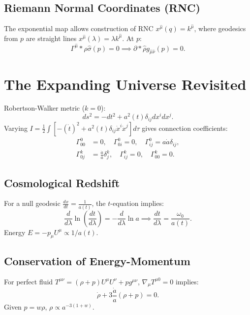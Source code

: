 \documentclass[11pt, a4paper]{report}
\begin{document}
\subsection*{Riemann Normal Coordinates (RNC)}
The exponential map allows construction of RNC $x^{\hat{\mu}}(q) = k^{\hat{\mu}}$, where geodesics from $p$ are straight lines $x^{\hat{\mu}}(\lambda) = \lambda k^{\hat{\mu}}$. At $p$:
\begin{equation}
\Gamma^{\hat{\mu}}*{\hat{\rho}\hat{\sigma}}(p) = 0 \implies \partial*{\hat{\rho}} g_{\hat{\mu}\hat{\nu}}(p) = 0.
\end{equation}

\section{The Expanding Universe Revisited}
Robertson-Walker metric ($k=0$):
\begin{equation}
ds^2 = -dt^2 + a^2(t) \delta_{ij} dx^i dx^j.
\end{equation}
Varying $I = \frac{1}{2} \int \left[ -(\dot{t})^2 + a^2(t) \delta_{ij} \dot{x}^i \dot{x}^j \right] d\tau$ gives connection coefficients:
\begin{align}
\Gamma^0_{00} &= 0, \quad \Gamma^0_{0i} = 0, \quad \Gamma^0_{ij} = a\dot{a} \delta_{ij}, \\
\Gamma^k_{0j} &= \frac{\dot{a}}{a} \delta^k_j, \quad \Gamma^k_{ij} = 0, \quad \Gamma^k_{00} = 0.
\end{align}

\subsection*{Cosmological Redshift}
For a null geodesic $\frac{dx}{dt} = \frac{1}{a(t)}$, the $t$-equation implies:
\begin{equation}
\frac{d}{d\lambda} \ln \left( \frac{dt}{d\lambda} \right) = - \frac{d}{d\lambda} \ln a \implies \frac{dt}{d\lambda} = \frac{\omega_0}{a(t)}.
\end{equation}
Energy $E = -p_\mu U^\mu \propto 1/a(t)$.

\subsection*{Conservation of Energy-Momentum}
For perfect fluid $T^{\mu\nu} = (\rho + p)U^\mu U^\nu + p g^{\mu\nu}$, $\nabla_\mu T^{\mu 0} = 0$ implies:
\begin{equation}
\dot{\rho} + 3\frac{\dot{a}}{a} (\rho + p) = 0.
\end{equation}
Given $p=w\rho$, $\rho \propto a^{-3(1+w)}$.
\end{document}
